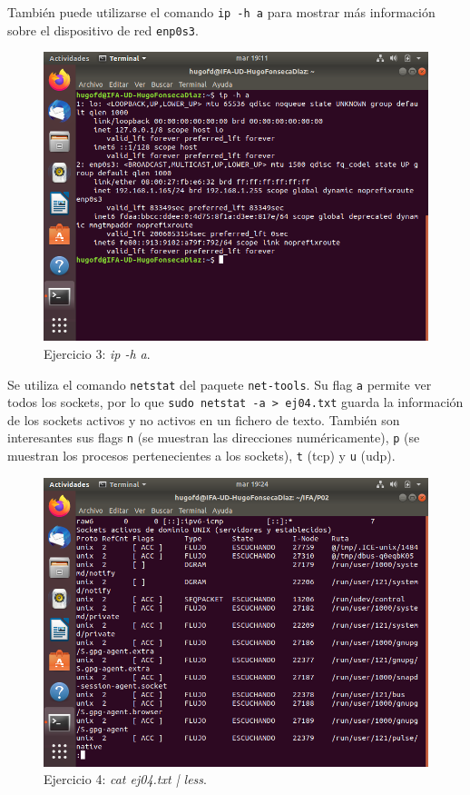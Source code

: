 \documentclass[11pt]{article}
\begin{document}
También puede utilizarse el comando \verb|ip -h a| para mostrar más información sobre el dispositivo de red \verb|enp0s3|.
\begin{figure}[h!]
    \caption{Ejercicio 3: \textit{ip -h a}.}
  \centering
  \includegraphics{e3-3.png}
\end{figure}
Se utiliza el comando \verb|netstat| del paquete \verb|net-tools|. Su flag \verb|a| permite ver todos los sockets, por lo que \verb|sudo netstat -a > ej04.txt| guarda la información de los sockets activos y no activos en un fichero de texto. También son interesantes sus flags \verb|n| (se muestran las direcciones numéricamente), \verb|p| (se muestran los procesos pertenecientes a los sockets), \verb|t| (tcp) y \verb|u| (udp).
\begin{figure}[h!]
    \caption{Ejercicio 4: \textit{cat ej04.txt | less}.}
  \centering
  \includegraphics{e4-1.png}
\end{figure}
\end{document}
